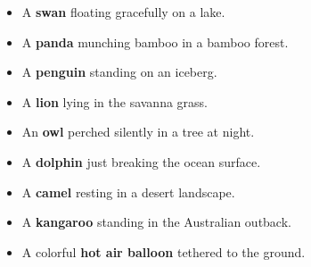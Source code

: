 \begin{itemize}
    \item A \textbf{swan} floating gracefully on a lake.
    \item A \textbf{panda} munching bamboo in a bamboo forest.
    \item A \textbf{penguin} standing on an iceberg.
    \item A \textbf{lion} lying in the savanna grass.
    \item An \textbf{owl} perched silently in a tree at night.
    \item A \textbf{dolphin} just breaking the ocean surface.
    \item A \textbf{camel} resting in a desert landscape.
    \item A \textbf{kangaroo} standing in the Australian outback.
    \item A colorful \textbf{hot air balloon} tethered to the ground.
\end{itemize}




